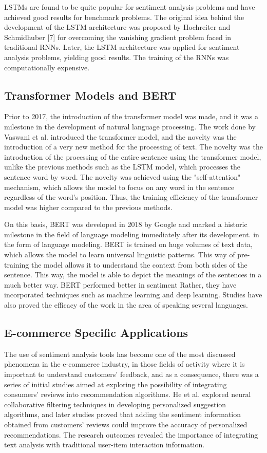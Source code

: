 \documentclass[11pt,a4paper]{article}
\begin{document}
LSTMs are found to be quite popular for sentiment analysis problems and have achieved good results for benchmark problems. The original idea behind the development of the LSTM architecture was proposed by Hochreiter and Schmidhuber [7] for overcoming the vanishing gradient problem faced in traditional RNNs. Later, the LSTM architecture was applied for sentiment analysis problems, yielding good results. The training of the RNNs was computationally expensive.

\subsection{Transformer Models and BERT}

Prior to 2017, the introduction of the transformer model was made, and it was a milestone in the development of natural language processing. The work done by Vaswani et al. introduced the transformer model, and the novelty was the introduction of a very new method for the processing of text. The novelty was the introduction of the processing of the entire sentence using the transformer model, unlike the previous methods such as the LSTM model, which processes the sentence word by word. The novelty was achieved using the "self-attention" mechanism, which allows the model to focus on any word in the sentence regardless of the word's position. Thus, the training efficiency of the transformer model was higher compared to the previous methods.

On this basis, BERT was developed in 2018 by Google and marked a historic milestone in the field of language modeling immediately after its development.
in the form of language modeling. BERT is trained on huge volumes of text data, which allows the model to learn universal linguistic patterns. This way of pre-training the model allows it to understand the context from both sides of the sentence. This way, the model is able to depict the meanings of the sentences in a much better way. BERT performed better in sentiment
Rather, they have incorporated techniques such as machine learning and deep learning. Studies have also proved the efficacy of the work in the area of speaking several languages.


\subsection{E-commerce Specific Applications}

The use of sentiment analysis tools has become one of the most discussed phenomena in the e-commerce industry, in those fields of activity where it is important to understand customers' feedback, and as a consequence, there was a series of initial studies aimed at exploring the possibility of integrating consumers' reviews into recommendation algorithms. He et al. explored neural collaborative filtering techniques in developing personalized suggestion algorithms, and later studies proved that adding the sentiment information obtained from customers' reviews could improve the accuracy of personalized recommendations. The research outcomes revealed the importance of integrating text analysis with traditional user-item interaction information.
\end{document}
